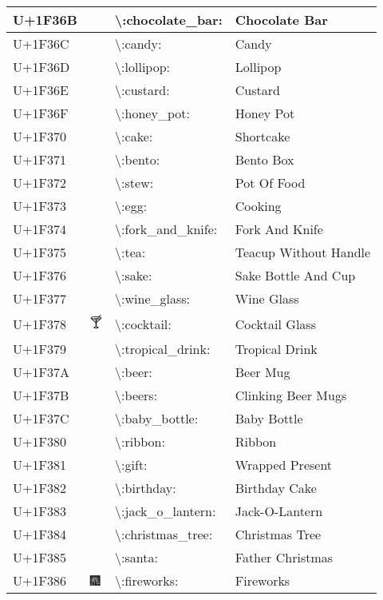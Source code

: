 \begin{table}[h]
\begin{tabulary}{\linewidth}{|L|L|L|L|}
\hline
U+1F36B & 🍫 & {\textbackslash}:chocolate\_bar: & Chocolate Bar \\
\hline
U+1F36C & 🍬 & {\textbackslash}:candy: & Candy \\
\hline
U+1F36D & 🍭 & {\textbackslash}:lollipop: & Lollipop \\
\hline
U+1F36E & 🍮 & {\textbackslash}:custard: & Custard \\
\hline
U+1F36F & 🍯 & {\textbackslash}:honey\_pot: & Honey Pot \\
\hline
U+1F370 & 🍰 & {\textbackslash}:cake: & Shortcake \\
\hline
U+1F371 & 🍱 & {\textbackslash}:bento: & Bento Box \\
\hline
U+1F372 & 🍲 & {\textbackslash}:stew: & Pot Of Food \\
\hline
U+1F373 & 🍳 & {\textbackslash}:egg: & Cooking \\
\hline
U+1F374 & 🍴 & {\textbackslash}:fork\_and\_knife: & Fork And Knife \\
\hline
U+1F375 & 🍵 & {\textbackslash}:tea: & Teacup Without Handle \\
\hline
U+1F376 & 🍶 & {\textbackslash}:sake: & Sake Bottle And Cup \\
\hline
U+1F377 & 🍷 & {\textbackslash}:wine\_glass: & Wine Glass \\
\hline
U+1F378 & 🍸 & {\textbackslash}:cocktail: & Cocktail Glass \\
\hline
U+1F379 & 🍹 & {\textbackslash}:tropical\_drink: & Tropical Drink \\
\hline
U+1F37A & 🍺 & {\textbackslash}:beer: & Beer Mug \\
\hline
U+1F37B & 🍻 & {\textbackslash}:beers: & Clinking Beer Mugs \\
\hline
U+1F37C & 🍼 & {\textbackslash}:baby\_bottle: & Baby Bottle \\
\hline
U+1F380 & 🎀 & {\textbackslash}:ribbon: & Ribbon \\
\hline
U+1F381 & 🎁 & {\textbackslash}:gift: & Wrapped Present \\
\hline
U+1F382 & 🎂 & {\textbackslash}:birthday: & Birthday Cake \\
\hline
U+1F383 & 🎃 & {\textbackslash}:jack\_o\_lantern: & Jack-O-Lantern \\
\hline
U+1F384 & 🎄 & {\textbackslash}:christmas\_tree: & Christmas Tree \\
\hline
U+1F385 & 🎅 & {\textbackslash}:santa: & Father Christmas \\
\hline
U+1F386 & 🎆 & {\textbackslash}:fireworks: & Fireworks \\

\end{tabulary}
\end{table}
